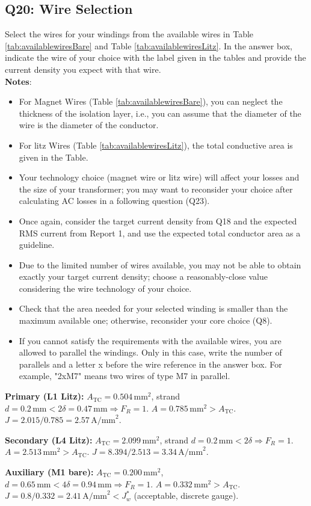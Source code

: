 \documentclass{PELsmallreport}
\begin{document}
\subsection{Q20: Wire Selection} 
Select the wires for your windings from the available wires in Table \ref{tab:availablewiresBare} and Table \ref{tab:availablewiresLitz}. 
In the answer box, indicate the wire of your choice with the label given in the tables and provide the current density you expect with that wire. 
\\

\textbf{Notes}:
\begin{itemize}
    \item For Magnet Wires (Table \ref{tab:availablewiresBare}), you can neglect the thickness of the isolation layer, i.e., you can assume that the diameter of the wire is the diameter of the conductor. 
    \item For litz Wires (Table \ref{tab:availablewiresLitz}), the total conductive area is given in the Table. 
    \item Your technology choice (magnet wire or litz wire) will affect your losses and the size of your transformer; you may want to reconsider your choice after calculating AC losses in a following question (Q23).  
    \item Once again, consider the target current density from Q18 and the expected RMS current from Report 1, and use the expected total conductor area as a guideline. 
    \item Due to the limited number of wires available, you may not be able to obtain exactly your target current density; choose a reasonably-close value considering the wire technology of your choice. 
    \item Check that the area needed for your selected winding is smaller than the maximum available one; otherwise, reconsider your core choice (Q8). 
    \item If you cannot satisfy the requirements with the available wires, you are allowed to parallel the windings. 
    Only in this case, write the number of parallels and a letter x before the wire reference in the answer box. 
    For example, "2xM7" means two wires of type M7 in parallel. 
\end{itemize}







\begin{framed}
\textbf{Primary (L1 Litz):} $A_\mathrm{TC}=0.504\,\mathrm{mm}^2$, strand $d=0.2\,\mathrm{mm}<2\delta=0.47\,\mathrm{mm}\Rightarrow F_R=1$. $A=0.785\,\mathrm{mm}^2>A_\mathrm{TC}$. $J=2.015/0.785=2.57\,\mathrm{A/mm}^2$.

\textbf{Secondary (L4 Litz):} $A_\mathrm{TC}=2.099\,\mathrm{mm}^2$, strand $d=0.2\,\mathrm{mm}<2\delta\Rightarrow F_R=1$. $A=2.513\,\mathrm{mm}^2>A_\mathrm{TC}$. $J=8.394/2.513=3.34\,\mathrm{A/mm}^2$.

\textbf{Auxiliary (M1 bare):} $A_\mathrm{TC}=0.200\,\mathrm{mm}^2$, $d=0.65\,\mathrm{mm}<4\delta=0.94\,\mathrm{mm}\Rightarrow F_R=1$. $A=0.332\,\mathrm{mm}^2>A_\mathrm{TC}$. $J=0.8/0.332=2.41\,\mathrm{A/mm}^2<J_w^*$ (acceptable, discrete gauge).
\end{framed}
\end{document}
